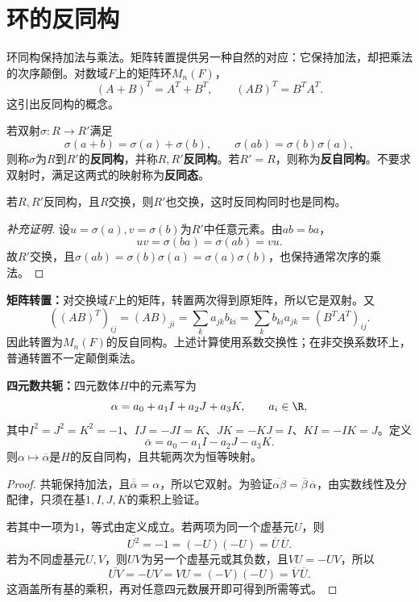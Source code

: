 \section{环的反同构}

环同构保持加法与乘法。矩阵转置提供另一种自然的对应：它保持加法，却把乘法的次序颠倒。对数域$F$上的矩阵环$M_n(F)$，
\[
(A+B)^T=A^T+B^T,\qquad(AB)^T=B^TA^T.
\]
这引出反同构的概念。

\begin{definition}
若双射$\sigma:R\to R'$满足
\[
\sigma(a+b)=\sigma(a)+\sigma(b),\qquad
\sigma(ab)=\sigma(b)\sigma(a),
\]
则称$\sigma$为$R$到$R'$的\textbf{反同构}，并称$R,R'$\textbf{反同构}。若$R'=R$，则称为\textbf{反自同构}。不要求双射时，满足这两式的映射称为\textbf{反同态}。
\end{definition}

\begin{proposition}
若$R,R'$反同构，且$R$交换，则$R'$也交换，这时反同构同时也是同构。
\end{proposition}
\begin{proof}[补充证明]
设$u=\sigma(a),v=\sigma(b)$为$R'$中任意元素。由$ab=ba$，
\[
uv=\sigma(ba)=\sigma(ab)=vu.
\]
故$R'$交换，且$\sigma(ab)=\sigma(b)\sigma(a)=\sigma(a)\sigma(b)$，也保持通常次序的乘法。
\end{proof}

\begin{example}
\textbf{矩阵转置：}对交换域$F$上的矩阵，转置两次得到原矩阵，所以它是双射。又
\[
((AB)^T)_{ij}=(AB)_{ji}=\sum_k a_{jk}b_{ki}
=\sum_k b_{ki}a_{jk}=(B^TA^T)_{ij}.
\]
因此转置为$M_n(F)$的反自同构。上述计算使用系数交换性；在非交换系数环上，普通转置不一定颠倒乘法。
\end{example}

\begin{example}
\textbf{四元数共轭：}四元数体$H$中的元素写为
\[
\alpha=a_0+a_1I+a_2J+a_3K,\qquad a_i\in\R,
\]
其中$I^2=J^2=K^2=-1$、$IJ=-JI=K$、$JK=-KJ=I$、$KI=-IK=J$。定义
\[
\overline\alpha=a_0-a_1I-a_2J-a_3K.
\]
则$\alpha\mapsto\overline\alpha$是$H$的反自同构，且共轭两次为恒等映射。
\end{example}
\begin{proof}
共轭保持加法，且$\overline{\overline\alpha}=\alpha$，所以它双射。为验证$\overline{\alpha\beta}=\overline\beta\,\overline\alpha$，由实数线性及分配律，只须在基$1,I,J,K$的乘积上验证。

若其中一项为1，等式由定义成立。若两项为同一个虚基元$U$，则
\[
\overline{U^2}=-1=(-U)(-U)=\overline U\,\overline U.
\]
若为不同虚基元$U,V$，则$UV$为另一个虚基元或其负数，且$VU=-UV$，所以
\[
\overline{UV}=-UV=VU=(-V)(-U)=\overline V\,\overline U.
\]
这涵盖所有基的乘积，再对任意四元数展开即可得到所需等式。
\end{proof}

